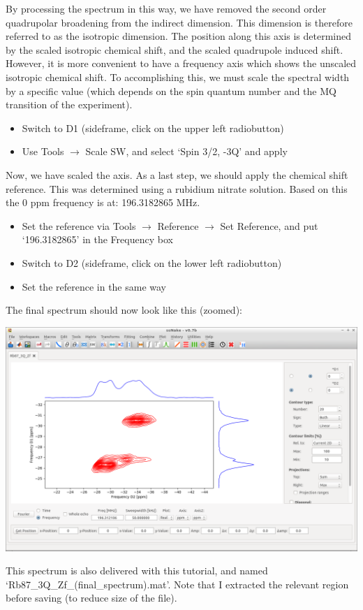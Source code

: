 \documentclass[11pt,a4paper]{article}
\begin{document}
By processing the spectrum in this way, we have removed the second order quadrupolar broadening from the indirect dimension.
This dimension is therefore referred to as the isotropic dimension.
The position along this axis is determined by the scaled isotropic chemical shift, and the scaled quadrupole induced shift.
However, it is more convenient to have a frequency axis which shows the unscaled isotropic chemical shift.
To accomplishing this, we must scale the spectral width by a specific value (which depends on the spin quantum number and the MQ transition of the experiment).
\begin{itemize}
	\item Switch to D1 (sideframe, click on the upper left radiobutton)
	\item Use Tools  $\longrightarrow$ Scale SW, and select `Spin 3/2, -3Q' and apply
\end{itemize}
Now, we have scaled the axis.
As a last step, we should apply the chemical shift reference.
This was determined using a rubidium nitrate solution.
Based on this the 0 ppm frequency is at: 196.3182865 MHz.
\begin{itemize}
  \item Set the reference via Tools $\longrightarrow$ Reference $\longrightarrow$ Set Reference, and
	 put `196.3182865' in the Frequency box
	\item Switch to D2 (sideframe, click on the lower left radiobutton)
	\item Set the reference in the same way
\end{itemize}
The final spectrum should now look like this (zoomed):
\begin{center}
\includegraphics[width=0.8\linewidth]{Figs/Fig8.png}
\end{center}
This spectrum is also delivered with this tutorial, and named `Rb87\_3Q\_Zf\_(final\_spectrum).mat'.
Note that I extracted the relevant region before saving (to reduce size of the file).
 
\end{document}
